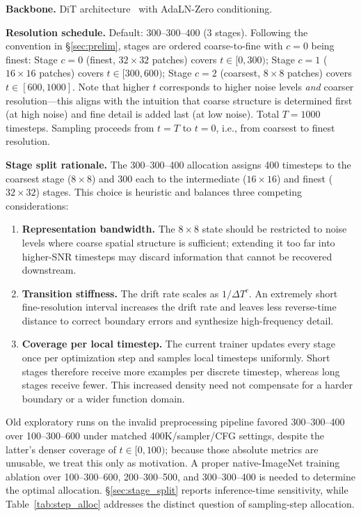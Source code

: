 \documentclass[10pt]{article}
\begin{document}
\textbf{Backbone.} DiT architecture~\citep{peebles2023dit} with AdaLN-Zero conditioning.

\textbf{Resolution schedule.} Default: $300$--$300$--$400$ (3 stages).
Following the convention in \S\ref{sec:prelim}, stages are ordered coarse-to-fine with $c=0$ being finest:
Stage $c=0$ (finest, $32\times32$ patches) covers $t \in [0, 300)$;
Stage $c=1$ ($16\times16$ patches) covers $t \in [300, 600)$;
Stage $c=2$ (coarsest, $8\times8$ patches) covers $t \in [600, 1000]$.
Note that higher $t$ corresponds to higher noise levels \emph{and} coarser resolution---this aligns with the intuition that coarse structure is determined first (at high noise) and fine detail is added last (at low noise).
Total $T = 1000$ timesteps.
Sampling proceeds from $t=T$ to $t=0$, i.e., from coarsest to finest resolution.

\textbf{Stage split rationale.}
The 300--300--400 allocation assigns 400 timesteps to the coarsest stage ($8\times8$) and 300 each to the intermediate ($16\times16$) and finest ($32\times32$) stages.
This choice is heuristic and balances three competing considerations:
\begin{enumerate}
    \item \textbf{Representation bandwidth.} The $8\times8$ state should be restricted to noise levels where coarse spatial structure is sufficient; extending it too far into higher-SNR timesteps may discard information that cannot be recovered downstream.
    \item \textbf{Transition stiffness.} The drift rate scales as $1/\Delta T^c$. An extremely short fine-resolution interval increases the drift rate and leaves less reverse-time distance to correct boundary errors and synthesize high-frequency detail.
    \item \textbf{Coverage per local timestep.} The current trainer updates every stage once per optimization step and samples local timesteps uniformly. Short stages therefore receive more examples per discrete timestep, whereas long stages receive fewer. This increased density need not compensate for a harder boundary or a wider function domain.
\end{enumerate}
Old exploratory runs on the invalid preprocessing pipeline favored 300--300--400 over 100--300--600 under matched 400K/sampler/CFG settings, despite the latter's denser coverage of $t\in[0,100)$; because those absolute metrics are unusable, we treat this only as motivation.
A proper native-ImageNet training ablation over 100--300--600, 200--300--500, and 300--300--400 is needed to determine the optimal allocation.
\S\ref{sec:stage_split} reports inference-time sensitivity, while Table~\ref{tab:step_alloc} addresses the distinct question of sampling-step allocation.
\end{document}

